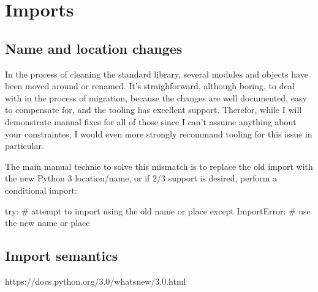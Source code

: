 
\chapter{Imports}


\section{Name and location changes}

In the process of cleaning the standard library, several modules and objects have been moved around or renamed. It's straighforward, although boring, to deal with in the process of migration, because the changes are well documented, easy to compensate for, and the tooling has excellent support. Therefor, while I will demonstrate manual fixes for all of those since I can't assume anything about your constraintes, I would even more strongly recommand tooling for this issue in particular.

The main manual technic to solve this mismatch is to replace the old import with the new Python 3 location/name, or if 2/3 support is desired, perform a conditional import:

\begin{py2and3}
try:
    # attempt to import using the old name or place
except ImportError:
    # use the new name or place
\end{py2and3}





\section{Import semantics}

https://docs.python.org/3.0/whatsnew/3.0.html








